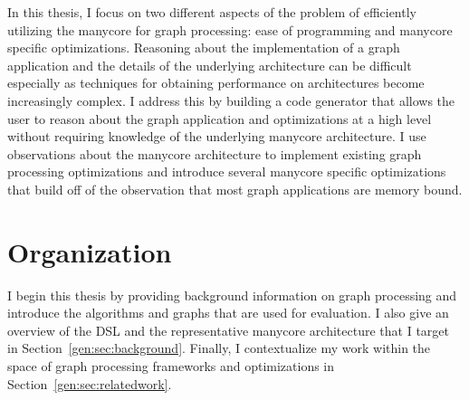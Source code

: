In this thesis, I focus on two different aspects of the problem of efficiently utilizing the manycore for graph processing: ease of programming and manycore specific optimizations. 
Reasoning about the implementation of a graph application and the details of the underlying architecture can be difficult especially as techniques for obtaining performance on architectures become increasingly complex. 
I address this by building a code generator that allows the user to reason about the graph application and optimizations at a high level without requiring knowledge of the underlying manycore architecture.
I use observations about the manycore architecture to implement existing graph processing optimizations and introduce several manycore specific optimizations that build off of the observation that most graph applications are memory bound. 


\section{Organization}

I begin this thesis by providing background information on graph processing and introduce the algorithms and graphs that are used for evaluation.
I also give an overview of the \graphit DSL and the representative manycore architecture that I target in Section~\ref{gen:sec:background}.
%
Finally, I contextualize my work within the space of graph processing frameworks and optimizations in Section~\ref{gen:sec:relatedwork}.



